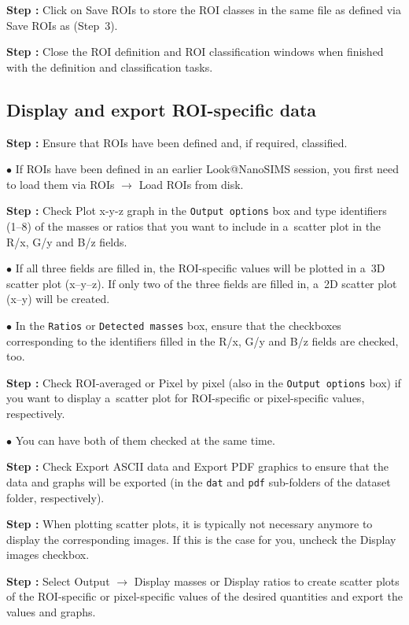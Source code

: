 \documentclass[a4paper, 11pt]{article}
\newcommand{\ttt}[1]{\texttt{#1}}
\newcommand{\lans}[1]{{\color{magenta}#1}}
\newcommand{\lanscb}[1]{{\color{darkgreen}#1}}
\newcommand{\lanstf}[1]{{\color{cyan}#1}}
\newcommand\ra{\rightarrow}
\newcounter{step}
\newcommand\s{\addtocounter{step}{1}\noindent\textbf{Step \thestep:}{ }}
\newcommand\bul{\noindent$\bullet${ }}
\begin{document}
\s Click on \lans{Save ROIs} to store the ROI classes in the same file as defined via \lans{Save ROIs as} (Step~3).

\s Close the ROI definition and ROI classification windows when finished with the definition and classification tasks.


\subsection{Display and export ROI-specific data}
\setcounter{step}{0}

\s Ensure that ROIs have been defined and, if required, classified.

\bul If ROIs have been defined in an earlier Look@NanoSIMS session, you first need to load them via \lans{ROIs} $\ra$ \lans{Load ROIs from disk}.

\s Check \lanscb{Plot x-y-z graph} in the \ttt{Output options} box and type identifiers (1--8) of the masses or ratios that you want to include in a~scatter plot in the \lanstf{R/x}, \lanstf{G/y} and \lanstf{B/z} fields. 

\bul If all three fields are filled in, the ROI-specific values will be plotted in a~3D scatter plot (x--y--z). If only two of the three fields are filled in, a~2D scatter plot (x--y) will be created.

\bul In the \ttt{Ratios} or \ttt{Detected masses} box, ensure that the checkboxes corresponding to the identifiers filled in the \lanstf{R/x}, \lanstf{G/y} and \lanstf{B/z} fields are checked, too. 

\s Check \lanscb{ROI-averaged} or \lanscb{Pixel by pixel} (also in the \ttt{Output options} box) if you want to display a~scatter plot for ROI-specific or pixel-specific values, respectively.

\bul You can have both of them checked at the same time. 

\s Check \lanscb{Export ASCII data} and \lanscb{Export PDF graphics} to ensure that the data and graphs will be exported (in the \ttt{dat} and \ttt{pdf} sub-folders of the dataset folder, respectively).

\s When plotting scatter plots, it is typically not necessary anymore to display the corresponding images. If this is the case for you, uncheck the \lanscb{Display images} checkbox.

\s Select \lans{Output} $\ra$ \lans{Display masses} or \lans{Display ratios} to create scatter plots of the ROI-specific or pixel-specific values of the desired quantities and export the values and graphs. 
\end{document}
